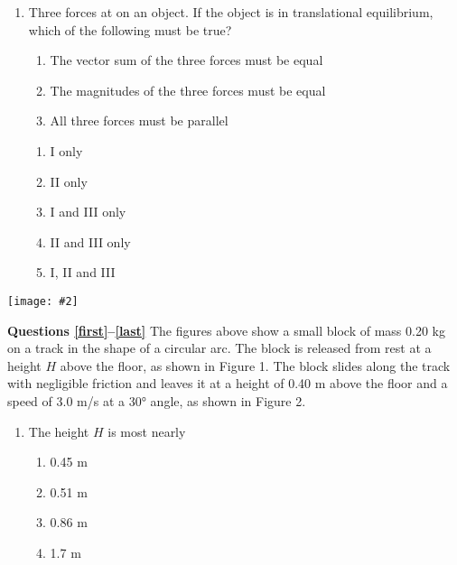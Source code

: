 \documentclass[11pt]{article}
\newcommand{\pic}[2]{\texttt{[image: \#2]}}
\begin{document}
\begin{multicols}{2}
\begin{enumerate}[leftmargin=18pt]
  \item Three forces at on an object. If the object is in translational
    equilibrium, which of the following must be true?
    \begin{enumerate}[nosep,leftmargin=18pt,label={\Roman*.}]
    \item The vector sum of the three forces must be equal
    \item The magnitudes of the three forces must be equal
    \item All three forces must be parallel
    \end{enumerate}
    \begin{enumerate}[nosep,leftmargin=18pt,label=(\Alph*)]
    \item I only
    \item II only
    \item I and III only
    \item II and III only
    \item I, II and III
    \end{enumerate}
    \vspace{.7in}    
  \end{enumerate}
  \columnbreak
  
  \begin{center}
    \pic{.5}{circular-arc}
  \end{center}
  \textbf{Questions \ref{first}--\ref{last}} The figures above show a small
  block of mass 0.20 kg on a track in the shape of a circular arc. The block is
  released from rest at a height $H$ above the floor, as shown in Figure 1. The
  block slides along the track with negligible friction and leaves it at a
  height of 0.40 m above the floor and a speed of 3.0 m/s at a \ang{30} angle,
  as shown in Figure 2.

  \begin{enumerate}[leftmargin=18pt,resume]
  \item The height $H$ is most nearly
    \begin{enumerate}[nosep,leftmargin=18pt,label=(\Alph*)]
    \item 0.45 m
    \item 0.51 m
    \item 0.86 m
    \item 1.7 m
    \end{enumerate}
    \label{first}
    

\end{enumerate}
\end{multicols}
\end{document}

